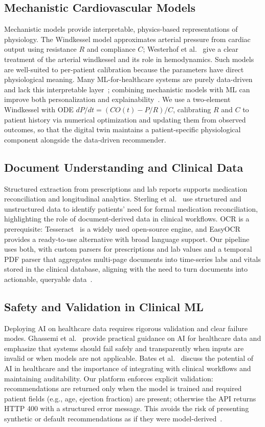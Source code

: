 \documentclass[conference]{IEEEtran}
\begin{document}
\subsection{Mechanistic Cardiovascular Models}
Mechanistic models provide interpretable, physics-based representations of physiology. The Windkessel model approximates arterial pressure from cardiac output using resistance $R$ and compliance $C$; Westerhof et al.~\cite{westerhof2009arterial} give a clear treatment of the arterial windkessel and its role in hemodynamics. Such models are well-suited to per-patient calibration because the parameters have direct physiological meaning. Many ML-for-healthcare systems are purely data-driven and lack this interpretable layer~\cite{rajkomar2019scalable}; combining mechanistic models with ML can improve both personalization and explainability~\cite{topol2019high}. We use a two-element Windkessel with ODE $dP/dt = (CO(t) - P/R)/C$, calibrating $R$ and $C$ to patient history via numerical optimization and updating them from observed outcomes, so that the digital twin maintains a patient-specific physiological component alongside the data-driven recommender.

\subsection{Document Understanding and Clinical Data}
Structured extraction from prescriptions and lab reports supports medication reconciliation and longitudinal analytics. Sterling et al.~\cite{sterling2016rxnorm} use structured and unstructured data to identify patients' need for formal medication reconciliation, highlighting the role of document-derived data in clinical workflows. OCR is a prerequisite: Tesseract~\cite{tesseract} is a widely used open-source engine, and EasyOCR~\cite{easyocr} provides a ready-to-use alternative with broad language support. Our pipeline uses both, with custom parsers for prescriptions and lab values and a temporal PDF parser that aggregates multi-page documents into time-series labs and vitals stored in the clinical database, aligning with the need to turn documents into actionable, queryable data~\cite{sterling2016rxnorm}.

\subsection{Safety and Validation in Clinical ML}
Deploying AI on healthcare data requires rigorous validation and clear failure modes. Ghassemi et al.~\cite{ghassemi2021practical} provide practical guidance on AI for healthcare data and emphasize that systems should fail safely and transparently when inputs are invalid or when models are not applicable. Bates et al.~\cite{bates2018cdss} discuss the potential of AI in healthcare and the importance of integrating with clinical workflows and maintaining auditability. Our platform enforces explicit validation: recommendations are returned only when the model is trained and required patient fields (e.g., age, ejection fraction) are present; otherwise the API returns HTTP 400 with a structured error message. This avoids the risk of presenting synthetic or default recommendations as if they were model-derived~\cite{ghassemi2021practical}.
\end{document}
